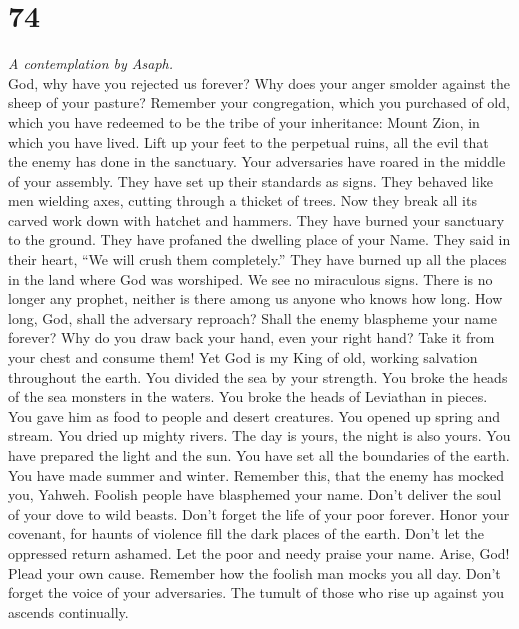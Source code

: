 \hypertarget{section-73}{%
\section{74}\label{section-73}}

\emph{A contemplation by Asaph.}\\
 God, why have you rejected us forever? Why does your
anger smolder against the sheep of your pasture?  Remember
your congregation, which you purchased of old, which you have redeemed
to be the tribe of your inheritance: Mount Zion, in which you have
lived.  Lift up your feet to the perpetual ruins, all the
evil that the enemy has done in the sanctuary.  Your
adversaries have roared in the middle of your assembly. They have set up
their standards as signs.  They behaved like men wielding
axes, cutting through a thicket of trees.  Now they break
all its carved work down with hatchet and hammers.  They
have burned your sanctuary to the ground. They have profaned the
dwelling place of your Name.  They said in their heart,
``We will crush them completely.'' They have burned up all the places in
the land where God was worshiped.  We see no miraculous
signs. There is no longer any prophet, neither is there among us anyone
who knows how long.  How long, God, shall the adversary
reproach? Shall the enemy blaspheme your name forever? 
Why do you draw back your hand, even your right hand? Take it from your
chest and consume them!  Yet God is my King of old,
working salvation throughout the earth.  You divided the
sea by your strength. You broke the heads of the sea monsters in the
waters.  You broke the heads of Leviathan in pieces. You
gave him as food to people and desert creatures.  You
opened up spring and stream. You dried up mighty rivers. 
The day is yours, the night is also yours. You have prepared the light
and the sun.  You have set all the boundaries of the
earth. You have made summer and winter.  Remember this,
that the enemy has mocked you, Yahweh. Foolish people have blasphemed
your name.  Don't deliver the soul of your dove to wild
beasts. Don't forget the life of your poor forever. 
Honor your covenant, for haunts of violence fill the dark places of the
earth.  Don't let the oppressed return ashamed. Let the
poor and needy praise your name.  Arise, God! Plead your
own cause. Remember how the foolish man mocks you all day.
 Don't forget the voice of your adversaries. The tumult
of those who rise up against you ascends continually.

